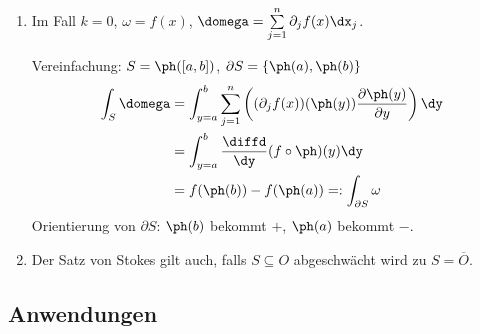 \begin{bem}[Bemerkungen.]
\label{bem:4.56}
\begin{enumerate}[label=\arabic{*}.)]
\item Im Fall $k=0$, $\omega = f(x)$, $\domega = \sum\limits_{j=1}^n \partial_j
f(x) \dx_j$.

Vereinfachung: $S=\ph([a,b])$, $\partial S = \{\ph(a),\ph(b)\}$
\begin{align*}
\int_S \domega &=
\int_{y=a}^b \sum\limits_{j=1}^n \left((\partial_j f(x))(\ph(y))
\frac{\partial \ph(y)}{\partial y}  \right) \dy \\ 
&= \int_{y=a}^b \frac{\diffd}{\dy} (f\circ\ph)(y) \dy \\
&= f(\ph(b))- f(\ph(a)) =: \int_{\partial S} \omega
\end{align*}
Orientierung von $\partial S$: $\ph(b)$ bekommt $+$, $\ph(a)$ bekommt $-$.
\item Der Satz von Stokes gilt auch, falls $S\subseteq O$ abgeschwächt wird zu
$S=\overline{O}$.\fishhere
\end{enumerate}
\end{bem}

\subsection{Anwendungen}

